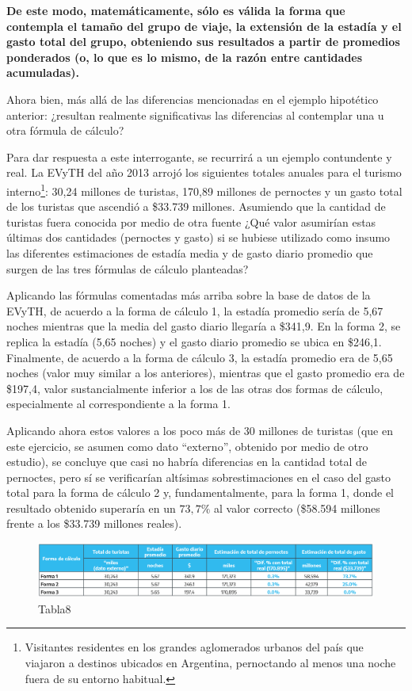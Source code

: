 \documentclass[
]{book}
\begin{document}
\textbf{De este modo, matemáticamente, sólo es válida la forma que contempla el tamaño del grupo de viaje, la extensión de la estadía y el gasto total del grupo, obteniendo sus resultados a partir de promedios ponderados (o, lo que es lo mismo, de la razón entre cantidades acumuladas).}

Ahora bien, más allá de las diferencias mencionadas en el ejemplo hipotético anterior: ¿resultan realmente significativas las diferencias al contemplar una u otra fórmula de cálculo?

Para dar respuesta a este interrogante, se recurrirá a un ejemplo contundente y real. La EVyTH del año 2013 arrojó los siguientes totales anuales para el turismo interno\footnote{Visitantes residentes en los grandes aglomerados urbanos del país que viajaron a destinos ubicados en Argentina, pernoctando al menos una noche fuera de su entorno habitual.}: 30,24 millones de turistas, 170,89 millones de pernoctes y un gasto total de los turistas que ascendió a \$33.739 millones. Asumiendo que la cantidad de turistas fuera conocida por medio de otra fuente ¿Qué valor asumirían estas últimas dos cantidades (pernoctes y gasto) si se hubiese utilizado como insumo las diferentes estimaciones de estadía media y de gasto diario promedio que surgen de las tres fórmulas de cálculo planteadas?

Aplicando las fórmulas comentadas más arriba sobre la base de datos de la EVyTH, de acuerdo a la forma de cálculo 1, la estadía promedio sería de 5,67 noches mientras que la media del gasto diario llegaría a \$341,9. En la forma 2, se replica la estadía (5,65 noches) y el gasto diario promedio se ubica en \$246,1. Finalmente, de acuerdo a la forma de cálculo 3, la estadía promedio era de 5,65 noches (valor muy similar a los anteriores), mientras que el gasto promedio era de \$197,4, valor sustancialmente inferior a los de las otras dos formas de cálculo, especialmente al correspondiente a la forma 1.

Aplicando ahora estos valores a los poco más de 30 millones de turistas (que en este ejercicio, se asumen como dato ``externo'', obtenido por medio de otro estudio), se concluye que casi no habría diferencias en la cantidad total de pernoctes, pero sí se verificarían altísimas sobrestimaciones en el caso del gasto total para la forma de cálculo 2 y, fundamentalmente, para la forma 1, donde el resultado obtenido superaría en un \(73,7\%\) al valor correcto (\$58.594 millones frente a los \$33.739 millones reales).

\begin{figure}

{\centering \includegraphics[width=1\linewidth]{imagenes/tabla_8} 

}

\caption{Tabla8}\label{fig:Formadecalculo}
\end{figure}
\end{document}
